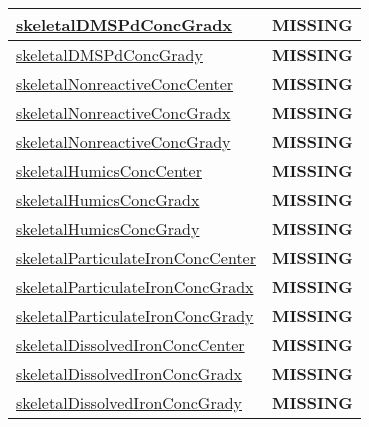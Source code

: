 {\begin{center}
\begin{longtable}{| p{2.0in} | p{4.0in} |}
    \hline
    \hyperref[subsec:var_sec_tracer_reconstruction_skeletalDMSPdConcGradx]{skeletalDMSPdConcGradx} & {\bf \color{red} MISSING} \\
    \hline
    \hyperref[subsec:var_sec_tracer_reconstruction_skeletalDMSPdConcGrady]{skeletalDMSPdConcGrady} & {\bf \color{red} MISSING} \\
    \hline
    \hyperref[subsec:var_sec_tracer_reconstruction_skeletalNonreactiveConcCenter]{skeletalNonreactiveConcCenter} & {\bf \color{red} MISSING} \\
    \hline
    \hyperref[subsec:var_sec_tracer_reconstruction_skeletalNonreactiveConcGradx]{skeletalNonreactiveConcGradx} & {\bf \color{red} MISSING} \\
    \hline
    \hyperref[subsec:var_sec_tracer_reconstruction_skeletalNonreactiveConcGrady]{skeletalNonreactiveConcGrady} & {\bf \color{red} MISSING} \\
    \hline
    \hyperref[subsec:var_sec_tracer_reconstruction_skeletalHumicsConcCenter]{skeletalHumicsConcCenter} & {\bf \color{red} MISSING} \\
    \hline
    \hyperref[subsec:var_sec_tracer_reconstruction_skeletalHumicsConcGradx]{skeletalHumicsConcGradx} & {\bf \color{red} MISSING} \\
    \hline
    \hyperref[subsec:var_sec_tracer_reconstruction_skeletalHumicsConcGrady]{skeletalHumicsConcGrady} & {\bf \color{red} MISSING} \\
    \hline
    \hyperref[subsec:var_sec_tracer_reconstruction_skeletalParticulateIronConcCenter]{skeletalParticulateIronConc\-Center} & {\bf \color{red} MISSING} \\
    \hline
    \hyperref[subsec:var_sec_tracer_reconstruction_skeletalParticulateIronConcGradx]{skeletalParticulateIronConc\-Gradx} & {\bf \color{red} MISSING} \\
    \hline
    \hyperref[subsec:var_sec_tracer_reconstruction_skeletalParticulateIronConcGrady]{skeletalParticulateIronConc\-Grady} & {\bf \color{red} MISSING} \\
    \hline
    \hyperref[subsec:var_sec_tracer_reconstruction_skeletalDissolvedIronConcCenter]{skeletalDissolvedIronConcCenter} & {\bf \color{red} MISSING} \\
    \hline
    \hyperref[subsec:var_sec_tracer_reconstruction_skeletalDissolvedIronConcGradx]{skeletalDissolvedIronConcGradx} & {\bf \color{red} MISSING} \\
    \hline
    \hyperref[subsec:var_sec_tracer_reconstruction_skeletalDissolvedIronConcGrady]{skeletalDissolvedIronConcGrady} & {\bf \color{red} MISSING} \\

\end{longtable}
\end{center}}
